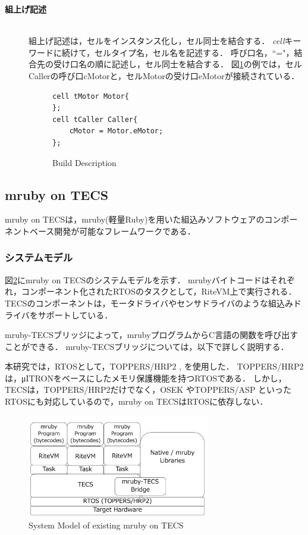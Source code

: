 \documentclass[submit]{ipsj_v2/UTF8/ipsj}
\begin{document}
\begin{description}
    \item[{\bf 組上げ記述}]\mbox{}\\
        組上げ記述は，セルをインスタンス化し，セル同士を結合する．
        {\it cell}キーワードに続けて，セルタイプ名，セル名を記述する．
        呼び口名，``="，結合先の受け口名の順に記述し，セル同士を結合する．
        図\ref{build}の例では，セルCallerの呼び口cMotorと，セルMotorの受け口eMotorが接続されている．
        
\begin{figure}[t]
\centering
\begin{lstlisting}
cell tMotor Motor{
};
cell tCaller Caller{
    cMotor = Motor.eMotor;
};
\end{lstlisting}
\caption{Build Description}
\label{build}
\end{figure}

\end{description}

\subsection{mruby on TECS}
\label{sec:mruby on TECS}
mruby on TECSは，mruby(軽量Ruby)を用いた組込みソフトウェアのコンポーネントベース開発が可能なフレームワークである．

\subsubsection{システムモデル}
図\ref{fig:mrubyontecs}にmruby on TECSのシステムモデルを示す．
mrubyバイトコードはそれぞれ，コンポーネント化されたRTOSのタスクとして，RiteVM上で実行される．
TECSのコンポーネントは，モータドライバやセンサドライバのような組込みドライバをサポートしている．

mruby-TECSブリッジによって，mrubyプログラムからC言語の関数を呼び出すことができる．
mruby-TECSブリッジについては，以下で詳しく説明する．

本研究では，RTOSとして，TOPPERS/HRP2 \cite{url:HRP2}, \cite{par:hr-tecs}を使用した．
TOPPERS/HRP2は，μITRON\cite{par:microITRON}をベースにしたメモリ保護機能を持つRTOSである．
しかし，TECSは，TOPPERS/HRP2だけでなく，OSEK \cite{par:OSEK}やTOPPERS/ASP \cite{url:ASP}といったRTOSにも対応しているので，mruby on TECSはRTOSに依存しない．

\begin{figure}[t]
    \centering
    \includegraphics[width=8cm,clip]{../EMSOFT2016/figure/mrubyontecs.pdf}
    \caption{System Model of existing mruby on TECS}
    \label{fig:mrubyontecs}
\end{figure}
\end{document}
